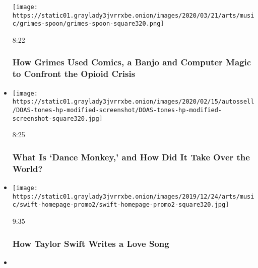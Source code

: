 \begin{itemize}
  \texttt{[image: https://static01.graylady3jvrrxbe.onion/images/2020/03/21/arts/music/grimes-spoon/grimes-spoon-square320.png]}

  8:22

  \hypertarget{how-grimes-used-comics-a-banjo-and-computer-magic-to-confront-the-opioid-crisis}{%
  \subsubsection{How Grimes Used Comics, a Banjo and Computer Magic to
  Confront the Opioid
  Crisis}\label{how-grimes-used-comics-a-banjo-and-computer-magic-to-confront-the-opioid-crisis}}
\item
  \href{https://www.nytimes3xbfgragh.onion/video/arts/music/100000006787476/dance-monkey-tones-and-i.html?action=click\&module=video-series-bar\&region=header\&pgtype=Article\&playlistId=video/diaryofasong}{}

  \texttt{[image: https://static01.graylady3jvrrxbe.onion/images/2020/02/15/autossell/DOAS-tones-hp-modified-screenshot/DOAS-tones-hp-modified-screenshot-square320.jpg]}

  8:25

  \hypertarget{what-is-dance-monkey-and-how-did-it-take-over-the-world}{%
  \subsubsection{What Is `Dance Monkey,' and How Did It Take Over the
  World?}\label{what-is-dance-monkey-and-how-did-it-take-over-the-world}}
\item
  \href{https://www.nytimes3xbfgragh.onion/video/arts/music/100000006843387/taylor-swift-lover.html?action=click\&module=video-series-bar\&region=header\&pgtype=Article\&playlistId=video/diaryofasong}{}

  \texttt{[image: https://static01.graylady3jvrrxbe.onion/images/2019/12/24/arts/music/swift-homepage-promo2/swift-homepage-promo2-square320.jpg]}

  9:35

  \hypertarget{how-taylor-swift-writes-a-love-song}{%
  \subsubsection{How Taylor Swift Writes a Love
  Song}\label{how-taylor-swift-writes-a-love-song}}
\item
  \href{https://www.nytimes3xbfgragh.onion/video/arts/music/100000006794269/fka-twigs-mary-magdalene.html?action=click\&module=video-series-bar\&region=header\&pgtype=Article\&playlistId=video/diaryofasong}{}


\end{itemize}

